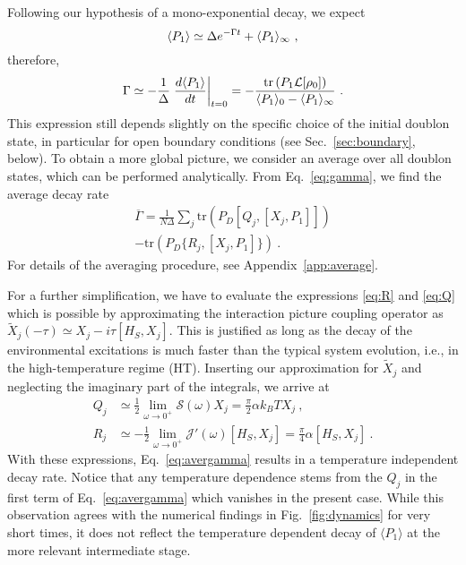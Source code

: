 \documentclass[twocolumn,prb,showpacs]{revtex4-1}
\DeclarePairedDelimiter\mean{\langle}{\rangle}
\newcommand*{\diff}{d}
\newcommand*{\tr}[1]{\mathrm{tr}\left(#1\right)}
\begin{document}
Following our hypothesis of a mono-exponential decay, we expect
\begin{equation}
    \label{eq:P1decay}
    \mean{P_1}\simeq \Delta e^{-\Gamma t} + \mean{P_1}_\infty \ ,
\end{equation} 
therefore,
\begin{equation}
    \Gamma\simeq - \frac{1}{\Delta}
    \left. \frac{\diff \mean{P_1}}{\diff t}\right|_{t=0}=
    -\frac{\tr{P_1\mathcal{L}[\rho_0]}}{\mean{P_1}_0-\mean{P_1}_\infty} \ .
    \label{eq:gamma}
\end{equation}
This expression still depends slightly on the specific choice of the
initial doublon state, in particular for open boundary conditions (see
Sec.~\ref{sec:boundary}, below).  To obtain a more global picture, we
consider an average over all doublon states, which can be performed
analytically.\cite{Storcz2005a}  From Eq.~\eqref{eq:gamma}, we find the
average decay rate
\begin{multline}
    \overline{\Gamma}=\frac{1}{N\Delta}\sum_j \tr{P_D[Q_j,[X_j,P_1]]} \\
    -\tr{P_D\{R_j,[X_j,P_1]\}} \ .
    \label{eq:avergamma}
\end{multline}
For details of the averaging procedure, see Appendix~\ref{app:average}.

For a further simplification, we have to evaluate the expressions
\eqref{eq:R} and \eqref{eq:Q} which is possible by approximating the
interaction picture coupling operator as $\tilde{X}_j(-\tau)\simeq X_j
-i\tau[H_S,X_j]$.  This is justified as long as the decay of the
environmental excitations is much faster than the typical system evolution,
i.e., in the high-temperature regime (HT).  Inserting our approximation for
$\tilde{X}_j$ and neglecting the imaginary part of the integrals, we arrive at
\begin{align} 
    Q_j & \simeq \frac{1}{2}\lim_{\omega\rightarrow 0^+} 
    \mathcal{S}(\omega) X_j = \frac{\pi}{2}\alpha k_B T X_j\ , \\ R_j & \simeq -
    \frac{1}{2}\lim_{\omega\rightarrow 0^+} \mathcal{J}'(\omega) [H_S,X_j] = 
    \frac{\pi}{4}\alpha [H_S,X_j] \ .  
\end{align} 
With these expressions, Eq.~\eqref{eq:avergamma} results in a temperature
independent decay rate.  Notice that any temperature dependence stems from
the $Q_j$ in the first term of Eq.~\eqref{eq:avergamma} which vanishes in
the present case.  While this observation agrees with the numerical findings in
Fig.~\ref{fig:dynamics} for very short times, it does not reflect the
temperature dependent decay of $\langle P_1\rangle$ at the more relevant
intermediate stage.
\end{document}
